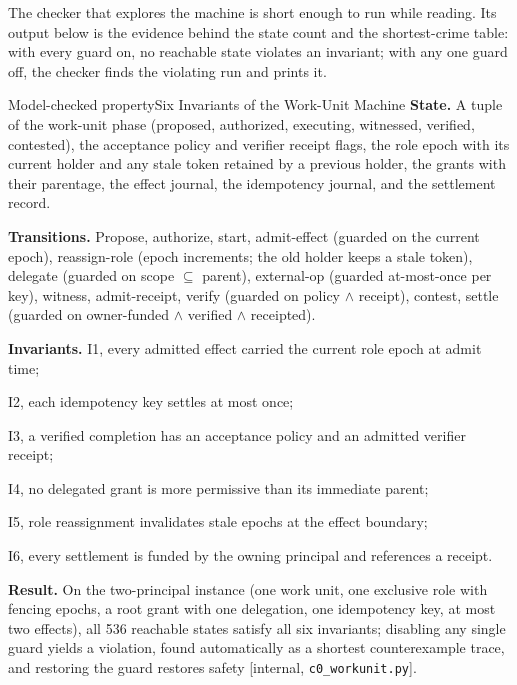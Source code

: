 \documentclass[11pt,a4paper]{article}
\theoremstyle{definition}
\theoremstyle{remark}
\begin{document}


The checker that explores the machine is short enough to run while reading. Its
output below is the evidence behind the state count and the shortest-crime table:
with every guard on, no reachable state violates an invariant; with any one guard
off, the checker finds the violating run and prints it.

\begingroup
\pdsessionwordwraptrue

\endgroup

\begin{pdclaim}{Model-checked property}{Six Invariants of the Work-Unit Machine}
\setlength{\parskip}{4pt plus 1pt}
\label{thm:workunit}
\textbf{State.} A tuple of the work-unit phase (proposed, authorized, executing, witnessed,
verified, contested), the acceptance policy and verifier receipt flags, the role epoch with
its current holder and any stale token retained by a previous holder, the grants with their
parentage, the effect journal, the idempotency journal, and the settlement record.

\textbf{Transitions.} Propose, authorize, start, admit-effect (guarded on the current
epoch), reassign-role (epoch increments; the old holder keeps a stale token), delegate
(guarded on scope $\subseteq$ parent), external-op (guarded at-most-once per key), witness,
admit-receipt, verify (guarded on policy $\wedge$ receipt), contest, settle (guarded on
owner-funded $\wedge$ verified $\wedge$ receipted).

\textbf{Invariants.}
I1, every admitted effect carried the current role epoch at admit time;

I2, each idempotency key settles at most once;

I3, a verified completion has an acceptance policy and an admitted verifier receipt;

I4, no delegated grant is more permissive than its immediate parent;

I5, role reassignment invalidates stale epochs at the effect boundary;

I6, every settlement is funded by the owning principal and references a receipt.

\textbf{Result.} On the two-principal instance (one work unit, one exclusive role with
fencing epochs, a root grant with one delegation, one idempotency key, at most two effects),
all 536 reachable states satisfy all six invariants; disabling any single guard yields a
violation, found automatically as a shortest counterexample trace, and restoring the guard
restores safety [internal, \texttt{c0\_workunit.py}].
\end{pdclaim}
\end{document}
